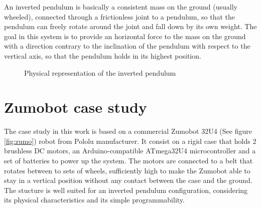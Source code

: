 
An inverted pendulum is basically a consistent mass on the ground (usually wheeled), connected through a frictionless joint to a pendulum, so that the pendulum can freely rotate around the joint and fall down by its own weight. The goal in this system is to provide an horizontal force to the mass on the ground with a direction contrary to the inclination of the pendulum with respect to the vertical axis, so that the pendulum holds in its highest position.

\begin{figure}[h]
	\centering
	\caption{Physical representation of the inverted pendulum}\label{fig:diag}
\end{figure}

\section{Zumobot case study}

The case study in this work is based on a commercial Zumobot 32U4 (See figure \ref{fig:zumo}) robot from Pololu manufacturer. It consist on a rigid case that holds 2 brushless DC motors, an Arduino-compatible ATmega32U4 microcontroller and a set of batteries to power up the system. The motors are connected to a belt that rotates between to sets of wheels, sufficiently high to make the Zumobot able to stay in a vertical position without any contact between the case and the ground. The stucture is well suited for an inverted pendulum configuration, considering its physical characteristics and its simple programmability.

